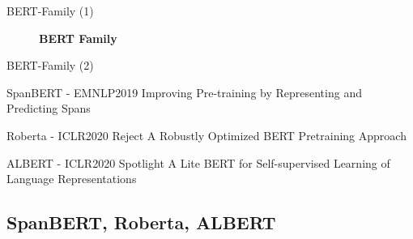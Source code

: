 \documentclass[10pt]{beamer}
\begin{document}
  \begin{frame}{BERT-Family (1)}
    \begin{figure}
      \centering
      \caption{\textbf{BERT Family} }
    \end{figure}
  \end{frame}

  \begin{frame}{BERT-Family (2)}

    \begin{exampleblock}{SpanBERT - EMNLP2019}
      Improving Pre-training by Representing and Predicting Spans
    \end{exampleblock}

    \begin{exampleblock}{Roberta - ICLR2020 Reject}
      A Robustly Optimized BERT Pretraining Approach
    \end{exampleblock}

    \begin{exampleblock}{ALBERT - ICLR2020 Spotlight}
      A Lite BERT for Self-supervised Learning of Language Representations
    \end{exampleblock}
  
  \end{frame}

  \subsection{SpanBERT, Roberta, ALBERT}
\end{document}
